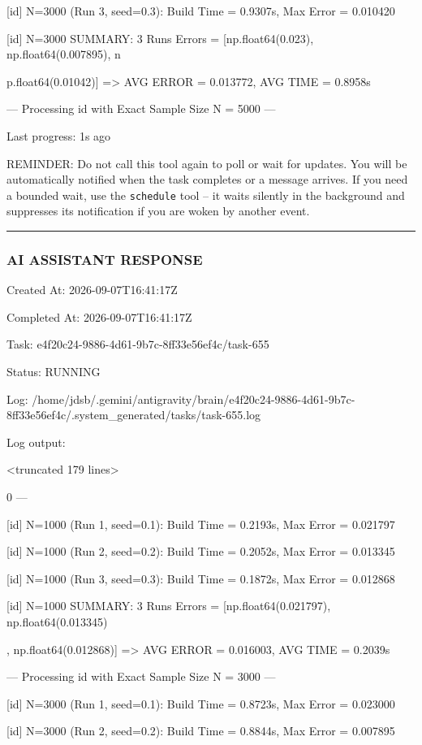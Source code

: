 \documentclass[11pt,a4paper]{article}
\begin{document}
[id] N=3000 (Run 3, seed=0.3): Build Time = 0.9307s, Max Error = 0.010420

[id] N=3000 SUMMARY: 3 Runs Errors = [np.float64(0.023), np.float64(0.007895), n

p.float64(0.01042)] => AVG ERROR = 0.013772, AVG TIME = 0.8958s

--- Processing id with Exact Sample Size N = 5000 ---


Last progress: 1s ago



REMINDER: Do not call this tool again to poll or wait for updates. You will be automatically notified when the task completes or a message arrives. If you need a bounded wait, use the \texttt{schedule} tool -- it waits silently in the background and suppresses its notification if you are woken by another event.


\hrule

\subsubsection{AI ASSISTANT RESPONSE}

Created At: 2026-09-07T16:41:17Z

Completed At: 2026-09-07T16:41:17Z

Task: e4f20c24-9886-4d61-9b7c-8ff33e56ef4c/task-655

Status: RUNNING

Log: /home/jdsb/.gemini/antigravity/brain/e4f20c24-9886-4d61-9b7c-8ff33e56ef4c/.system\_generated/tasks/task-655.log

Log output:

<truncated 179 lines>

0 ---

[id] N=1000 (Run 1, seed=0.1): Build Time = 0.2193s, Max Error = 0.021797

[id] N=1000 (Run 2, seed=0.2): Build Time = 0.2052s, Max Error = 0.013345

[id] N=1000 (Run 3, seed=0.3): Build Time = 0.1872s, Max Error = 0.012868

[id] N=1000 SUMMARY: 3 Runs Errors = [np.float64(0.021797), np.float64(0.013345)

, np.float64(0.012868)] => AVG ERROR = 0.016003, AVG TIME = 0.2039s

--- Processing id with Exact Sample Size N = 3000 ---

[id] N=3000 (Run 1, seed=0.1): Build Time = 0.8723s, Max Error = 0.023000

[id] N=3000 (Run 2, seed=0.2): Build Time = 0.8844s, Max Error = 0.007895
\end{document}
